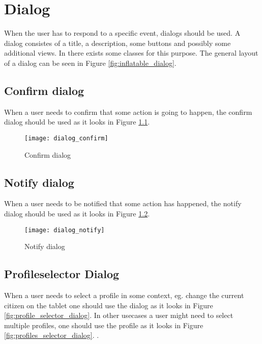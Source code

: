 
\chapter{Dialog}
\label{cha:dialog}


When the user has to respond to a specific event, dialogs should be used. A dialog consistes of a title, a description, some buttons and possibly some additional views. In \gc there exists some classes for this purpose. The general layout of a dialog can be seen in Figure \ref{fig:inflatable_dialog}.

\section{Confirm dialog}
\label{sec:confirm_dialog}

When a user needs to confirm that some action is going to happen, the confirm dialog should be used as it looks in Figure \ref{fig:confirm_dialog}. 

\begin{figure}[h]
	\centering
	\texttt{[image: dialog\_confirm]}
	\caption{Confirm dialog}
	\label{fig:confirm_dialog}
\end{figure}
\FloatBarrier

\section{Notify dialog}
\label{sec:notify_dialog}

When a user needs to be notified that some action has happened, the notify dialog should be used as it looks in Figure \ref{fig:notify_dialog}. 

\begin{figure}[h]
	\centering
	\texttt{[image: dialog\_notify]}
	\caption{Notify dialog}
	\label{fig:notify_dialog}
\end{figure}
\FloatBarrier

\section{Profileselector Dialog}
\label{sec:profileselector_dialog}

When a user needs to select a profile in some context, eg. change the current citizen on the tablet one should use the dialog as it looks in Figure \ref{fig:profile_selector_dialog}. In other usecases a user might need to select multiple profiles, one should use the profile as it looks in Figure \ref{fig:profiles_selector_dialog}. .

